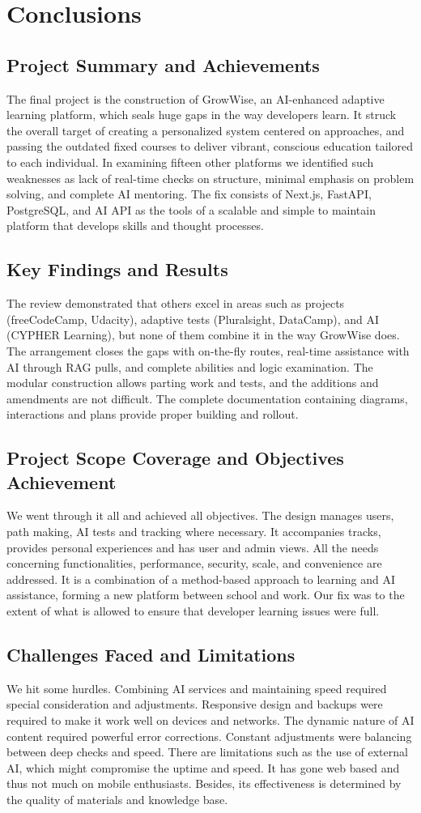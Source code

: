 \documentclass{FastFyp}
\begin{document}
\chapter{Conclusions}
\section{Project Summary and Achievements}
The final project is the construction of GrowWise, an AI-enhanced adaptive learning platform, which seals huge gaps in the way developers learn. It struck the overall target of creating a personalized system centered on approaches, and passing the outdated fixed courses to deliver vibrant, conscious education tailored to each individual. In examining fifteen other platforms we identified such weaknesses as lack of real-time checks on structure, minimal emphasis on problem solving, and complete AI mentoring. The fix consists of Next.js, FastAPI, PostgreSQL, and AI API as the tools of a scalable and simple to maintain platform that develops skills and thought processes.
\section{Key Findings and Results}
The review demonstrated that others excel in areas such as projects (freeCodeCamp, Udacity), adaptive tests (Pluralsight, DataCamp), and AI (CYPHER Learning), but none of them combine it in the way GrowWise does. The arrangement closes the gaps with on-the-fly routes, real-time assistance with AI through RAG pulls, and complete abilities and logic examination. The modular construction allows parting work and tests, and the additions and amendments are not difficult. The complete documentation containing diagrams, interactions and plans provide proper building and rollout.
\section{Project Scope Coverage and Objectives Achievement}
We went through it all and achieved all objectives. The design manages users, path making, AI tests and tracking where necessary. It accompanies tracks, provides personal experiences and has user and admin views. All the needs concerning functionalities, performance, security, scale, and convenience are addressed. It is a combination of a method-based approach to learning and AI assistance, forming a new platform between school and work. Our fix was to the extent of what is allowed to ensure that developer learning issues were full.
\section{Challenges Faced and Limitations}
We hit some hurdles. Combining AI services and maintaining speed required special consideration and adjustments. Responsive design and backups were required to make it work well on devices and networks. The dynamic nature of AI content required powerful error corrections. Constant adjustments were balancing between deep checks and speed. There are limitations such as the use of external AI, which might compromise the uptime and speed. It has gone web based and thus not much on mobile enthusiasts. Besides, its effectiveness is determined by the quality of materials and knowledge base.
\end{document}
